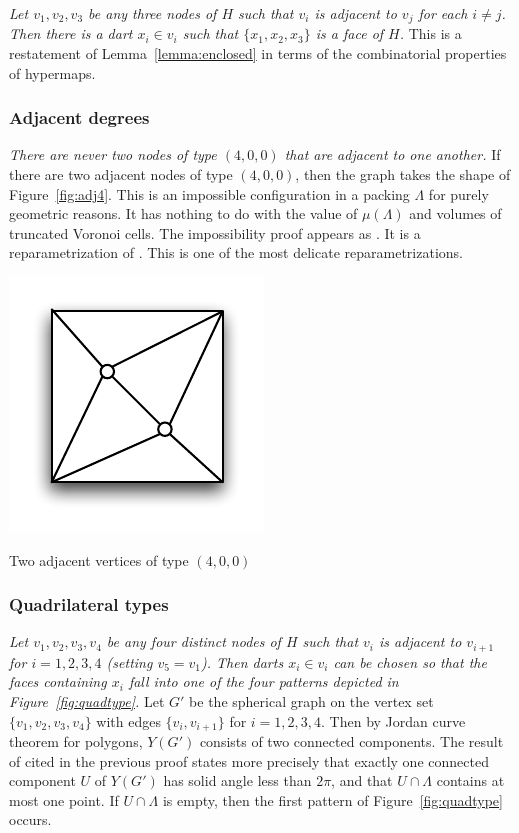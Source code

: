 \documentclass{article} %
\begin{document}
{\it Let $v_1,v_2,v_3$ be any three nodes of $H$ such that $v_i$ is
adjacent to $v_j$ for each $i\ne j$. Then there is a dart $x_i\in v_i$
such that $\{x_1,x_2,x_3\}$ is a face of $H$.}
This is a restatement of Lemma~\ref{lemma:enclosed} in terms of the
combinatorial properties of hypermaps.

\subsubsection{Adjacent degrees}

{\it There are never two nodes of type $(4,0,0)$ that are adjacent to one another.}
If there are two adjacent nodes of type $(4,0,0)$, then the graph takes the
shape of Figure~\ref{fig:adj4}.  This is an impossible configuration in a packing $\Lambda$
for purely geometric reasons.  It has nothing to do with the value of $\mu(\Lambda)$
and volumes of truncated Voronoi cells.
The impossibility proof appears as \cite[Lemma~3.8]{Hales:2002:Dodec}. It is a reparametrization
of \cite[Prop.4.2]{Hales:1997:DCG}.  This is one of the most delicate reparametrizations.

\begin{Figure}[htb]
  \begin{center}
    \includegraphics[scale=0.50]{images/adj4.pdf}
   \end{center}
  \caption{Two adjacent vertices of type $(4,0,0)$}
  \label{fig:adj4}
\end{Figure}

\subsubsection{Quadrilateral types}

{\it Let $v_1,v_2,v_3,v_4$ be any four distinct nodes of $H$ such that $v_i$ is adjacent
to $v_{i+1}$ for $i=1,2,3,4$ (setting $v_5=v_1$).  Then darts $x_i\in v_i$ can be chosen
so that the faces containing $x_i$ fall into one of the four patterns depicted
in Figure~\ref{fig:quadtype}.}
%
Let $G'$ be the spherical graph on the vertex set $\{v_1,v_2,v_3,v_4\}$
with edges $\{v_i,v_{i+1}\}$ for $i=1,2,3,4$.  Then by
Jordan curve theorem for polygons, $Y(G')$ consists of two connected components.
The result of \cite[Lemma~3.8]{Hales:2002:Dodec} cited in the previous proof states more precisely
that exactly one connected component $U$ of $Y(G')$ has solid angle less than $2\pi$,
and that $U\cap\Lambda$ contains at most one point.
If $U\cap\Lambda$ is empty, then the first pattern of Figure~\ref{fig:quadtype} occurs.
\end{document}
